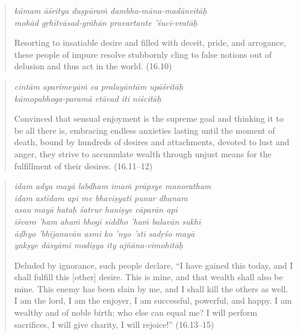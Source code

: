 \documentclass[12pt, twoside, openright]{memoir}
\begin{document}
\par
\begin{verse}
\textit{kāmam āśritya duṣpūraṁ dambha-māna-madānvitāḥ} \\
\textit{mohād gṛhītvāsad-grāhān pravartante ’śuci-vratāḥ}

\noindent Resorting to insatiable desire and filled with deceit, pride, and arrogance, these people of impure resolve stubbornly cling to false notions out of delusion and thus act in the world. (16.10)
\end{verse}
\par



\par
\begin{verse}
\textit{cintām aparimeyāṁ ca pralayāntām upāśritāḥ} \\
\textit{kāmopabhoga-paramā etāvad iti niścitāḥ}

\noindent Convinced that sensual enjoyment is the supreme goal and thinking it to be all there is, embracing endless anxieties lasting until the moment of death, bound by hundreds of desires and attachments, devoted to lust and anger, they strive to accumulate wealth through unjust means for the fulfillment of their desires. (16.11–12)
\end{verse}
\par



\par
\begin{verse}
\textit{idam adya mayā labdham imaṁ prāpsye manoratham} \\
\textit{idam astīdam api me bhaviṣyati punar dhanam} \\
\textit{asau mayā hataḥ śatrur haniṣye cāparān api} \\
\textit{īśvaro ’ham ahaṁ bhogī siddho ’haṁ balavān sukhī} \\
\textit{āḍhyo ’bhijanavān asmi ko ’nyo ’sti sadṛśo mayā} \\
\textit{yakṣye dāsyāmi modiṣya ity ajñāna-vimohitāḥ}

\noindent Deluded by ignorance, such people declare, \enquote{I have gained this today, and I shall fulfill this [other] desire. This is mine, and that wealth shall also be mine. This enemy has been slain by me, and I shall kill the others as well. I am the lord, I am the enjoyer, I am successful, powerful, and happy. I am wealthy and of noble birth; who else can equal me? I will perform sacrifices, I will give charity, I will rejoice!} (16.13–15)
\end{verse}
\par
\end{document}
